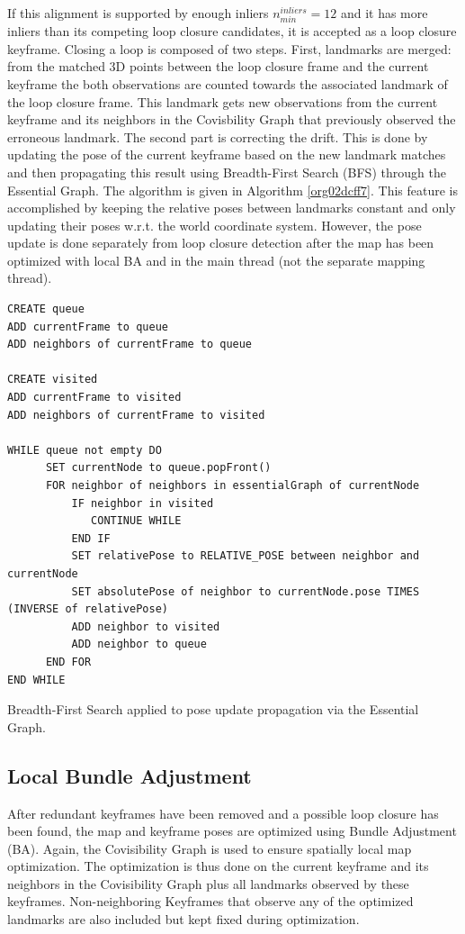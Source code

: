 \documentclass[a4paper, 10pt]{article}
\begin{document}
If this alignment is supported by enough inliers \(n_{min}^{inliers}=12\) and it has more inliers than its competing loop closure candidates, it is accepted as a loop closure keyframe.
Closing a loop is composed of two steps. First, landmarks are merged: from the matched 3D points between the loop closure frame and the current keyframe the both observations are 
counted towards the associated landmark of the loop closure frame. This landmark gets new observations from the current keyframe and its neighbors in the Covisbility Graph that previously observed the erroneous landmark. 
The second part is correcting the drift. This is done by updating the pose of the current keyframe based on the new landmark matches and then propagating this result using Breadth-First Search (BFS) \cite{bfs} through the Essential Graph. 
The algorithm is given in Algorithm \ref{org02dcff7}. This feature is accomplished by keeping the relative poses between landmarks constant and only updating their poses w.r.t. the world coordinate system.
However, the pose update is done separately from loop closure detection after the map has been optimized with local BA and in the main thread (not the separate mapping thread).

\begin{listing}[th]
\begin{verbatim}
CREATE queue
ADD currentFrame to queue
ADD neighbors of currentFrame to queue

CREATE visited
ADD currentFrame to visited
ADD neighbors of currentFrame to visited

WHILE queue not empty DO
      SET currentNode to queue.popFront()
      FOR neighbor of neighbors in essentialGraph of currentNode
          IF neighbor in visited
             CONTINUE WHILE
          END IF
          SET relativePose to RELATIVE_POSE between neighbor and currentNode
          SET absolutePose of neighbor to currentNode.pose TIMES (INVERSE of relativePose)
          ADD neighbor to visited
          ADD neighbor to queue
      END FOR
END WHILE

\end{verbatim}
\caption{\label{org02dcff7}
Breadth-First Search applied to pose update propagation via the Essential Graph.}
\end{listing}

\subsection{Local Bundle Adjustment}
\label{sec:org9b8e1de}
After redundant keyframes have been removed and a possible loop closure has been found, the map and keyframe poses are optimized using Bundle Adjustment (BA). Again, the Covisibility Graph is used to ensure spatially local map optimization. 
The optimization is thus done on the current keyframe and its neighbors in the Covisibility Graph plus all landmarks observed by these keyframes.
Non-neighboring Keyframes that observe any of the optimized landmarks are also included but kept fixed during optimization.
\end{document}
